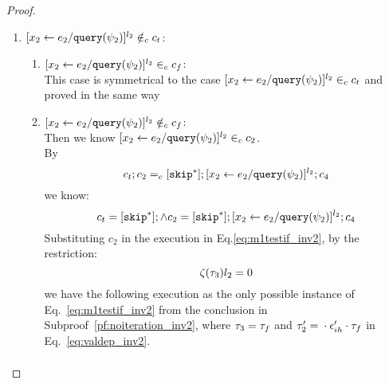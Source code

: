 \begin{proof}
\begin{case}[$\trace_2 = \trace_{ih} \cdot \event_{ih}$]
\begin{subcase}
\begin{subsubcase}
\begin{subproof}
\begin{enumerate}
 \[
  \config{c_f;c_2, \vtrace} \rightarrow^{*} 
  \config{[\assign{{x}_2}{\expr_2 / \query(\qexpr_2)}]^{l_2};{c}_4', \trace'}
 \]
 This is contradict to the existence of execution in Eq.\ref{eq:m1testif_inv2}.
 \\
 If $[\assign{{x}_2}{\expr_2 / \query(\qexpr_2)}]^{l_2} \in_c c_2$, 
 by uniqueness of label , 
 it must exist in the body of a while command in $c_2$,
 and $\eif ([b]^{l_b}, c_t, c_f) \in_c c_2$ and $[\assign{{x}_2}{\expr_2 / \query(\qexpr_2)}]^{l_2} \in_c c_t$. 
\\
%
i.e., $[\assign{{x}_2}{\expr_2 / \query(\qexpr_2)}]^{l_2}$ will only show up in $c_t$.
\\
%
By $\flowsto$ definition, we have:
\[
  \forall z_i^{r_i} \in \lvar_{c_t},  x_j^{l_j} \in \lvar_c \st x_j \in VAR(b) \land x_j^{l_j} \in \live^{l_b}(c) \implies
  \flowsto(x_j^{l_j}, z_i^{r_i}, c)
\]
%
Since $x_1 \in VAR(b)$ and $x_1^{l_1} \in \live^{l_b}(c)$, we know:
%
\[
\flowsto(x_1^{l_1}, x_2^{l_2}, c)
\]
%
i.e.,
\[
\Big(\exists z_1^{r_1}, \cdots, z_n^{r_n} \in \lvar_{{c}} \st 0 \leq n 
 \land \flowsto(x_1^{l_1}, z_1^{r_1}, c) \land \cdots \land \flowsto(z_n^{r_n}, {x}_2^{l_2}, c) \Big)
\]
%
This case is proved.
\item $[\mathrel{ {x}_2 \leftarrow e_2 / {\tt query}(\psi_2) }]^{l_2} \notin_c c_t$:
\begin{enumerate}
 \item $[\mathrel{ {x}_2 \leftarrow e_2 / {\tt query}(\psi_2) }]^{l_2} \in_c c_f$:
 \\
 This case is symmetrical to the case $[\assign{{x}_2}{\expr_2 / \query(\qexpr_2)}]^{l_2} \in_c c_t$ and proved in the same way
 \item $[\mathrel{ {x}_2 \leftarrow e_2 / {\tt query}(\psi_2) }]^{l_2} \notin_c c_f$:
 \\
 Then we know $[\assign{{x}_2}{\expr_2 / \query(\qexpr_2)}]^{l_2} \in_c c_2$.
 \\
 By
 \[
  c_t;c_2 =_c [\mathtt{skip}^*]; [\mathrel{ {x}_2 \leftarrow e_2 / {\tt query}(\psi_2) }]^{l_2};{c}_4
\]
we know:
\[
  c_t = [\mathtt{skip}^*]; \land c_2 = [\mathtt{skip}^*]; [\mathrel{ {x}_2 \leftarrow e_2 / {\tt query}(\psi_2) }]^{l_2};{c}_4
\]
Substituting $c_2$ in the execution in Eq.\ref{eq:m1testif_inv2}, by the restriction:
\[
  \mathtt{\zeta}(\mathtt{\tau}_3)l_2 = 0
\]
we have the following execution as the only possible instance of Eq.~\ref{eq:m1testif_inv2} from the conclusion in Subproof~\ref{pf:noiteration_inv2}, where $\mathtt{\tau}_3 = \mathtt{\tau}_f$ 
and $\mathtt{\tau}_2' = {} \cdot {} \mathtt{\epsilon}_{ih}' \cdot \mathtt{\tau}_f$ in Eq.~\ref{eq:valdep_inv2}.
\[
    \begin{array}{l}   

\end{array}\]
\end{enumerate}
\end{enumerate}
\end{subproof}
\end{subsubcase}
\end{subcase}
\end{case}
\end{proof}
